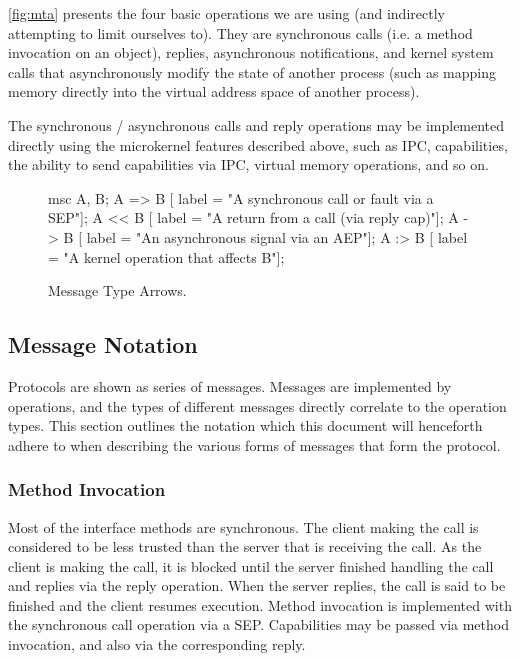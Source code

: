 \autoref{fig:mta} presents the four basic operations we are using (and
indirectly attempting to limit ourselves to). They are synchronous calls (i.e.
a method invocation on an object), replies, asynchronous notifications, and
kernel system calls that asynchronously modify the state of another process
(such as mapping memory directly into the virtual address space of another
process).

The synchronous / asynchronous calls and reply operations may be implemented
directly using the microkernel features described above, such as IPC,
capabilities, the ability to send capabilities via IPC, virtual memory
operations, and so on.

\begin{figure}[htb]
  \centering
  \begin{msc}
    msc {
      A, B;
      A => B [ label = "A synchronous call or fault via a SEP"];
      A << B [ label = "A return from a call (via reply cap)"];
      A -> B [ label = "An asynchronous signal via an AEP"];
      A :> B [ label = "A kernel operation that affects B"];
    }
  \end{msc}
  \caption{Message Type Arrows.}
  \label{fig:mta}
\end{figure}

\subsection{Message Notation} 

Protocols are shown as series of messages. Messages are implemented by operations,
and the types of different messages directly correlate to the operation types.
This section outlines the notation which this document will henceforth adhere to
when describing the various forms of messages that form the  protocol.

\subsubsection*{Method Invocation}

Most of the interface methods are synchronous. The client making the call is
considered to be less trusted than the server that is receiving the call. As
the client is making the call, it is blocked until the server finished handling
the call and replies via the reply operation. When the server replies, the call
is said to be finished and the client resumes execution. Method invocation is
implemented with the synchronous call operation via a SEP. Capabilities may be
passed via method invocation, and also via the corresponding reply.

